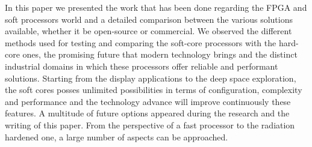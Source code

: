 \hspace{0.5cm} In this paper we presented the work that has been done regarding the FPGA and soft
processors world and a detailed comparison between the various solutions available, whether
it be open-source or commercial. We observed the different methods used for testing and
comparing the soft-core processors with the hard-core ones, the promising future that modern
technology brings and the distinct industrial domains in which these processors offer reliable
and performant solutions. Starting from the display applications to the deep space
exploration, the soft cores posses unlimited possibilities in terms of configuration, complexity
and performance and the technology advance will improve continuously these features. A
multitude of future options appeared during the research and the writing of this paper. From
the perspective of a fast processor to the radiation hardened one, a large number of aspects
can be approached.